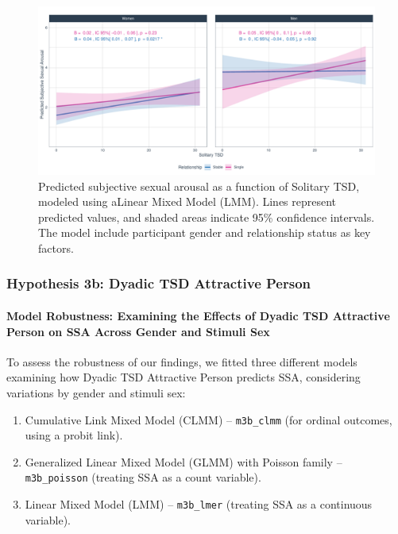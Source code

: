 \documentclass[
  bookmarksnumbered]{article}
\providecommand{\tightlist}{%
  \setlength{\itemsep}{0pt}\setlength{\parskip}{0pt}}
\begin{document}
\begin{figure}
\centering
\includegraphics{Sexual_Desire_Arousal_anonymous_files/figure-latex/fig-h3a-1.pdf}
\caption{\label{fig:fig-h3a}Predicted subjective sexual arousal as a function of Solitary TSD, modeled using aLinear Mixed Model (LMM). Lines represent predicted values, and shaded areas indicate 95\% confidence intervals. The model include participant gender and relationship status as key factors.}
\end{figure}

\subsubsection{Hypothesis 3b: Dyadic TSD Attractive Person}\label{hyp3b}

\paragraph{Model Robustness: Examining the Effects of Dyadic TSD Attractive Person on SSA Across Gender and Stimuli Sex}\label{model-robustness-examining-the-effects-of-dyadic-tsd-attractive-person-on-ssa-across-gender-and-stimuli-sex-1}

To assess the robustness of our findings, we fitted three different models examining how Dyadic TSD Attractive Person predicts SSA, considering variations by gender and stimuli sex:

\begin{enumerate}
\def\labelenumi{\arabic{enumi}.}
\tightlist
\item
  Cumulative Link Mixed Model (CLMM) -- \texttt{m3b\_clmm} (for ordinal outcomes, using a probit link).
\item
  Generalized Linear Mixed Model (GLMM) with Poisson family -- \texttt{m3b\_poisson} (treating SSA as a count variable).
\item
  Linear Mixed Model (LMM) -- \texttt{m3b\_lmer} (treating SSA as a continuous variable).
\end{enumerate}
\end{document}
